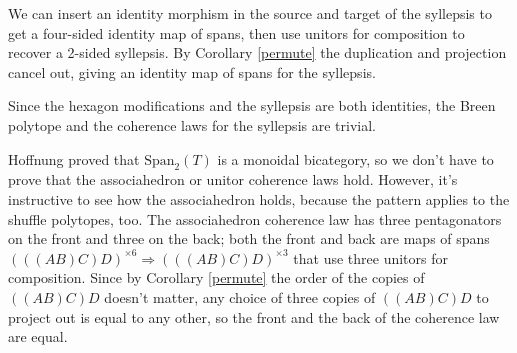 \documentclass[12pt,twoside,openright]{report}
\newcommand{\Span}{\mbox{Span}}
\begin{document}
We can insert an identity morphism in the source and target of the syllepsis to get a four-sided identity map of spans, then use unitors for composition to recover a 2-sided syllepsis.  By Corollary \ref {permute} the duplication and projection cancel out, giving an identity map of spans for the syllepsis.

\begin{center}
\end{center}

Since the hexagon modifications and the syllepsis are both identities, the Breen polytope and the coherence laws for the syllepsis are trivial.

Hoffnung proved that $\Span_2(T)$ is a monoidal bicategory, so we don't have to prove that the associahedron or unitor coherence laws hold.  However, it's instructive to see how the associahedron holds, because the pattern applies to the shuffle polytopes, too.  The associahedron coherence law has three pentagonators on the front and three on the back; both the front and back are maps of spans $(((AB)C)D)^{\times 6} \Rightarrow (((AB)C)D)^{\times 3}$ that use three unitors for composition.  Since by Corollary \ref{permute} the order of the copies of $((AB)C)D$ doesn't matter, any choice of three copies of $((AB)C)D$ to project out is equal to any other, so the front and the back of the coherence law are equal.
\end{document}
